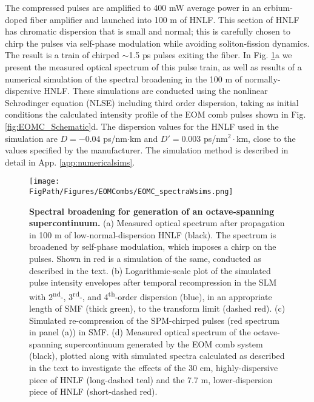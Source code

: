The compressed pulses are amplified to 400 mW average power in an erbium-doped fiber amplifier and launched into 100 m of HNLF. This section of HNLF has chromatic dispersion that is small and normal; this is carefully chosen to chirp the pulses via self-phase modulation while avoiding soliton-fission dynamics\cite{Dudley2006}. The result is a train of chirped $\sim$1.5 ps pulses exiting the fiber.  In Fig. \ref{fig:EOMC_Broadening}a we present the measured optical spectrum of this pulse train, as well as results of a numerical simulation of the spectral broadening in the 100 m of normally-dispersive HNLF. These simulations are conducted using the nonlinear Schrodinger equation (NLSE) including third order dispersion\cite{Agrawal2007}, taking as initial conditions the calculated intensity profile of the EOM comb pulses shown in Fig. \ref{fig:EOMC_Schematic}d. The dispersion values for the HNLF used in the simulation are $D=-0.04$  ps/nm$\cdot$km and $D'=0.003$ ps/nm$^2\cdot$km, close to the values specified by the manufacturer. The simulation method is described in detail in App. \ref{app:numericalsims}.

\begin{figure}[htpb]
	\begin{center}
		\texttt{[image: \\FigPath/Figures/EOMCombs/EOMC\_spectraWsims.png]}
	\end{center}
	\caption[Figure Title]{\textbf{Spectral broadening for generation of an octave-spanning supercontinuum.} (a) Measured optical spectrum after propagation in 100 m of low-normal-dispersion HNLF (black). The spectrum is broadened by self-phase modulation, which imposes a chirp on the pulses. Shown in red is a simulation of the same, conducted as described in the text. (b) Logarithmic-scale plot of the simulated pulse intensity envelopes after temporal recompression in the SLM with 2\textsuperscript{nd}-, 3\textsuperscript{rd}-, and 4\textsuperscript{th}-order dispersion (blue), in an appropriate length of SMF (thick green), to the transform limit (dashed red). (c) Simulated re-compression of the SPM-chirped pulses (red spectrum in panel (a)) in SMF. (d) Measured optical spectrum of the octave-spanning supercontinuum generated by the EOM comb system (black), plotted along with simulated spectra calculated as described in the text to investigate the effects of the 30 cm, highly-dispersive piece of HNLF (long-dashed teal) and the 7.7 m, lower-dispersion piece of HNLF (short-dashed red).}
	\label{fig:EOMC_Broadening}
\end{figure} 



